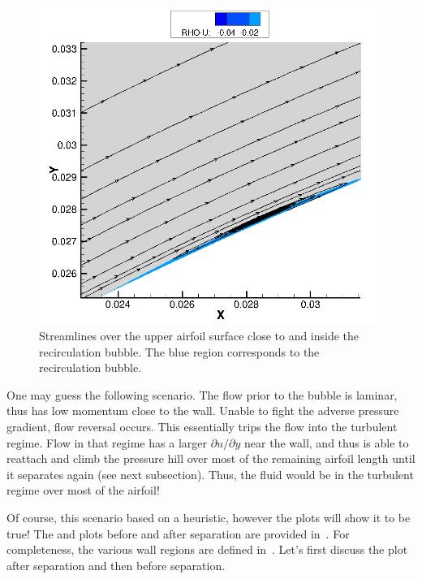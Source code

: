 \begin{figure}
    \centering
    \includegraphics[width=1.0\textwidth]{./figs/recirculation_upper.png}
    \caption{Streamlines over the upper airfoil surface close to and inside the
        recirculation bubble. The blue region corresponds to the recirculation
        bubble.}\label{fig:recirculation_upper}
\end{figure}

One may guess the following scenario. The flow prior to the bubble is laminar, thus has
low momentum close to the wall. Unable
to fight the adverse pressure gradient, flow reversal occurs. This essentially trips
the flow into the turbulent regime. Flow in that regime has a larger $\partial u/\partial y$
near the wall, and thus is able to reattach and climb the pressure hill over most of the
remaining airfoil length until it separates again (see next subsection).
Thus, the fluid would be in the turbulent regime over most of the airfoil!

Of course, this scenario based on a heuristic, however the \uplu plots
will show it to be true! The \uplu and \yplus plots before and after separation
are provided in~. For completeness, the various wall regions are defined
in~. Let's first discuss the plot after separation and then
before separation.


